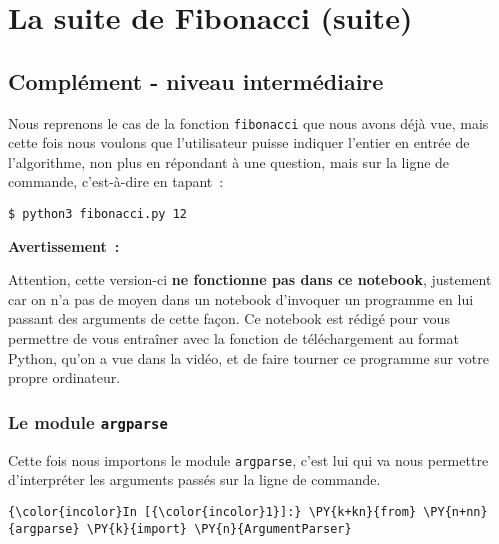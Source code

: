     
    
    
    

    

    \hypertarget{la-suite-de-fibonacci-suite}{%
\section{La suite de Fibonacci
(suite)}\label{la-suite-de-fibonacci-suite}}

    \hypertarget{compluxe9ment---niveau-intermuxe9diaire}{%
\subsection{Complément - niveau
intermédiaire}\label{compluxe9ment---niveau-intermuxe9diaire}}

    Nous reprenons le cas de la fonction \texttt{fibonacci} que nous avons
déjà vue, mais cette fois nous voulons que l'utilisateur puisse indiquer
l'entier en entrée de l'algorithme, non plus en répondant à une
question, mais sur la ligne de commande, c'est-à-dire en tapant~:

\begin{verbatim}
$ python3 fibonacci.py 12
\end{verbatim}

    \textbf{Avertissement~:}

Attention, cette version-ci \textbf{ne fonctionne pas dans ce notebook},
justement car on n'a pas de moyen dans un notebook d'invoquer un
programme en lui passant des arguments de cette façon. Ce notebook est
rédigé pour vous permettre de vous entraîner avec la fonction de
téléchargement au format Python, qu'on a vue dans la vidéo, et de faire
tourner ce programme sur votre propre ordinateur.

    \hypertarget{le-module-argparse}{%
\subsubsection{\texorpdfstring{Le module
\texttt{argparse}}{Le module argparse}}\label{le-module-argparse}}

    Cette fois nous importons le module \texttt{argparse}, c'est lui qui va
nous permettre d'interpréter les arguments passés sur la ligne de
commande.

    \begin{Verbatim}[commandchars=\\\{\}]
{\color{incolor}In [{\color{incolor}1}]:} \PY{k+kn}{from} \PY{n+nn}{argparse} \PY{k}{import} \PY{n}{ArgumentParser}
\end{Verbatim}


